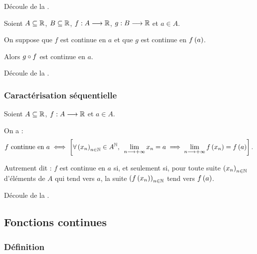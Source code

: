 \begin{dem}
Découle de la .
\end{dem}

\begin{prop}[Composition]
Soient \(A\subseteq\mathbb{R}\), \(B\subseteq\mathbb{R}\), \(f:A\longrightarrow\mathbb{R}\), \(g:B\longrightarrow\mathbb{R}\) et \(a\in A\).

On suppose que \(f\) est continue en \(a\) et que \(g\) est continue en \(f\left(a\right)\).

Alors \(g\circ f\) est continue en \(a\).
\end{prop}

\begin{dem}
Découle de la .
\end{dem}

\subsubsection{Caractérisation séquentielle}

\begin{prop}
Soient \(A\subseteq\mathbb{R}\), \(f:A\longrightarrow\mathbb{R}\) et \(a\in A\).

On a : \[f\text{ continue en }a\ssi\croch{\quantifs{\forall\paren{x_n}_{n\in\N}\in A^\N}\lim_{n\to\pinf}x_n=a\imp\lim_{n\to\pinf}f\paren{x_n}=f\paren{a}}.\]

Autrement dit : \(f\) est continue en \(a\) si, et seulement si, pour toute suite \(\left(x_n\right)_{n\in\mathbb{N}}\) d'éléments de \(A\) qui tend vers \(a\), la suite \(\left(f\left(x_n\right)\right)_{n\in\mathbb{N}}\) tend vers \(f\left(a\right)\).
\end{prop}

\begin{dem}
Découle de la .
\end{dem}

\subsection{Fonctions continues}

\subsubsection{Définition}

